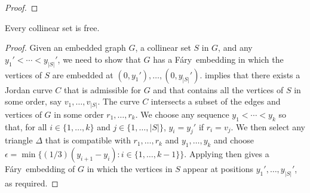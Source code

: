 \documentclass{patmorin}
\newcommand{\Fary}{Fáry}
\begin{document}
\begin{proof}
%
\end{proof}

\begin{cor}
  Every collinear set is free.
\end{cor}

\begin{proof}
   Given an embedded graph $G$, a collinear set $S$ in $G$,
   and any $y_1'<\cdots<y_{|S|}'$, we need to show that $G$ has
   a \Fary\ embedding in which the vertices of $S$ are embedded at
   $(0,y_1'),\ldots,(0,y_{|S|}')$.   implies
   that there exists a Jordan curve $C$ that is admissible for $G$
   and that contains all the vertices of $S$ in some order, say
   $v_1,\ldots,v_{|S|}$.  The curve $C$ intersects a subset of the edges
   and vertices of $G$ in some order $r_1,\ldots,r_k$.  We choose any
   sequence $y_1<\cdots<y_k$ so that, for all $i\in\{1,\ldots,k\}$ and
   $j\in\{1,\ldots,|S|\}$, $y_i = y_j'$ if $r_i=v_j$.  We then select
   any triangle $\Delta$ that is compatible with $r_1,\ldots,r_k$ and
   $y_1,\ldots,y_k$ and choose $\epsilon = \min\{(1/3)(y_{i+1}-y_{i}):
   i\in\{1,\ldots,k-1\}\}$.  Applying  then gives a \Fary\
   embedding of $G$ in which the vertices in $S$ appear at positions
   $y_1',\ldots,y_{|S|}'$, as required.
\end{proof}
\end{document}
